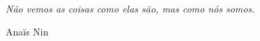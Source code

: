 %
%

\

\vfill

\begin{flushright}
\begin{minipage}{.5\textwidth}
	\textit{Não vemos as coisas como elas são, mas como nós somos.}\\
    \begin{flushright}
	  Anaïs Nin
    \end{flushright}
\end{minipage}
\end{flushright}

\vspace*{1cm}
\newpage
